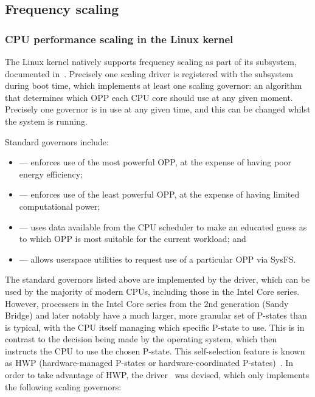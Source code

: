 \subsection{Frequency scaling}

\subsubsection{CPU performance scaling in the Linux kernel}

The Linux kernel natively supports frequency scaling as part of its 
subsystem, documented in~\cite{linuxCPUScaling}. Precisely one scaling driver is
registered with the subsystem during boot time, which implements at least one
scaling governor: an algorithm that determines which OPP each CPU core should
use at any given moment. Precisely one governor is in use at any given time,
and this can be changed whilst the system is running.

Standard governors include:
\begin{itemize}
    \item {} — enforces use of the most powerful OPP, at the
        expense of having poor energy efficiency;
    \item {} — enforces use of the least powerful OPP, at the
        expense of having limited computational power;
    \item {} — uses data available from the CPU scheduler to make
        an educated guess as to which OPP is most suitable for the current
        workload; and
    \item {} — allows userspace utilities to request use of a
        particular OPP via SysFS.
\end{itemize}

The standard governors listed above are implemented by the 
driver, which can be used by the majority of modern CPUs, including those in
the Intel Core series. However, processers in the Intel Core series from the
2nd generation (Sandy Bridge) and later notably have a much larger, more
granular set of P-states than is typical, with the CPU itself managing which
specific P-state to use. This is in contrast to the decision being made by the
operating system, which then instructs the CPU to use the chosen P-state. This
self-selection feature is known as HWP (hardware-managed P-states or
hardware-coordinated P-states)~\cite[Vol. 3, §14.3.2.3]{intelDevManual}. In
order to take advantage of HWP, the 
driver~\cite{linuxIntelPState} was devised, which only implements the following
scaling governors:

